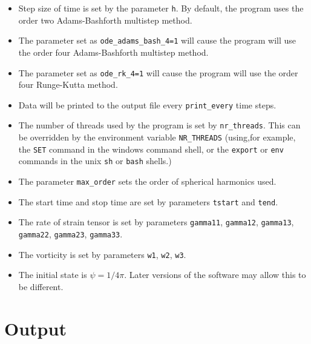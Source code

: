 \documentclass{amsart}
\begin{document}
\begin{itemize}
\item Step size of time is set by the parameter {\tt h}.  By default, the program uses the order two Adams-Bashforth multistep method.
\item The parameter set as {\tt ode\_adams\_bash\_4=1} will cause the program will use the order four Adams-Bashforth multistep method.
\item The parameter set as {\tt ode\_rk\_4=1} will cause the program will use the order four Runge-Kutta method.
\item Data will be printed to the output file every {\tt print\_every} time steps.
\item The number of threads used by the program is set by {\tt nr\_threads}.  This can be overridden by the environment variable {\tt NR\_THREADS} (using,for example, the {\tt SET} command in the windows command shell, or the {\tt export} or {\tt env} commands in the unix {\tt sh} or {\tt bash} shells.)
\item The parameter {\tt max\_order} sets the order of spherical harmonics used.
\item The start time and stop time are set by parameters {\tt tstart} and {\tt tend}.
\item The rate of strain tensor is set by parameters {\tt gamma11}, {\tt gamma12}, {\tt gamma13}, {\tt gamma22}, {\tt gamma23}, {\tt gamma33}.
\item The vorticity is set by parameters {\tt w1}, {\tt w2}, {\tt w3}.
\item The initial state is $\psi = 1/4\pi$.  Later versions of the software may allow this to be different.
\end{itemize}

\section*{Output}
\end{document}
